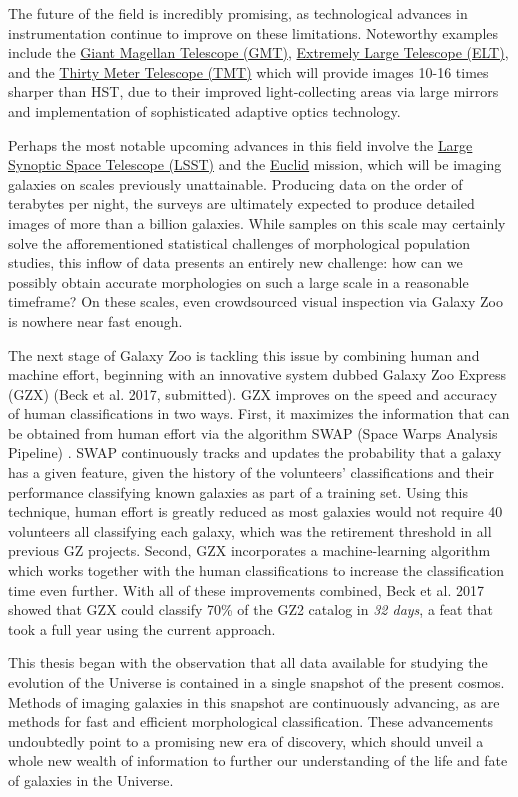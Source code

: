 The future of the field is incredibly promising, as technological advances in instrumentation continue to improve on these limitations. Noteworthy examples include the \href{http://www.gmto.org/}{Giant Magellan Telescope (GMT)}, \href{http://www.eso.org/public/teles-instr/elt/}{Extremely Large Telescope (ELT)}, and the \href{http://www.tmt.org/}{Thirty Meter Telescope (TMT)} which will provide images 10-16 times sharper than HST, due to their improved light-collecting areas via large mirrors and implementation of sophisticated adaptive optics technology. 

Perhaps the most notable upcoming advances in this field involve the \href{https://www.lsst.org/}{Large Synoptic Space Telescope (LSST)} and the \href{http://sci.esa.int/euclid/}{Euclid} mission, which will be imaging galaxies on scales previously unattainable. Producing data on the order of terabytes per night, the surveys are ultimately expected to produce detailed images of more than a billion galaxies. While samples on this scale may certainly solve the afforementioned statistical challenges of morphological population studies, this inflow of data presents an entirely new challenge: how can we possibly obtain accurate morphologies on such a large scale in a reasonable timeframe? On these scales, even crowdsourced visual inspection via Galaxy Zoo is nowhere near fast enough. 

The next stage of Galaxy Zoo is tackling this issue by combining human and machine effort, beginning with an innovative system dubbed Galaxy Zoo Express (GZX) (Beck et al. 2017, submitted). GZX improves on the speed and accuracy of human classifications in two ways. First, it maximizes the information that can be obtained from human effort via the algorithm SWAP (Space Warps Analysis Pipeline) \citep{Marshall2016}. SWAP continuously tracks and updates the probability that a galaxy has a given feature, given the history of the volunteers' classifications and their performance classifying known galaxies as part of a training set. Using this technique, human effort is greatly reduced as most galaxies would not require 40 volunteers all classifying each galaxy, which was the retirement threshold in all previous GZ projects. Second, GZX incorporates a machine-learning algorithm which works together with the human classifications to increase the classification time even further. With all of these improvements combined, Beck et al. 2017 showed that GZX could classify 70\% of the GZ2 catalog in \emph{32 days}, a feat that took a full year using the current approach. 

This thesis began with the observation that all data available for studying the evolution of the Universe is contained in a single snapshot of the present cosmos. Methods of imaging galaxies in this snapshot are continuously advancing, as are methods for fast and efficient morphological classification. These advancements undoubtedly point to a promising new era of discovery, which should unveil a whole new wealth of information to further our understanding of the life and fate of galaxies in the Universe. 

 

